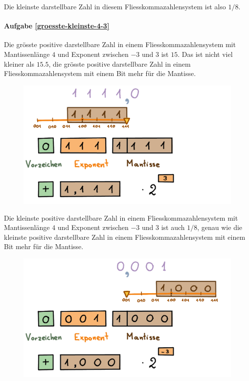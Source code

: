 Die kleinste darstellbare Zahl in diesem Fliesskommazahlensystem ist also \(1/8\).

\paragraph{Aufgabe \ref{groesste-kleinste-4-3}}
Die grösste positive darstellbare Zahl in einem Fliesskommazahlensystem mit Mantissenlänge \(4\) und Exponent zwischen \(-3\) und \(3\) ist \(15\). Das ist nicht viel kleiner als \(15.5\), die grösste positive darstellbare Zahl in einem Fliesskommazahlensystem mit einem Bit mehr für die Mantisse.
\begin{figure}[H]
\centering
\includegraphics[width=0.85\linewidth]{Pictures/groessteZahl-4-3.png}
\end{figure}

Die kleinste positive darstellbare Zahl in einem Fliesskommazahlensystem mit Mantissenlänge \(4\) und Exponent zwischen \(-3\) und \(3\) ist auch \(1/8\), genau wie die kleinste positive darstellbare Zahl in einem Fliesskommazahlensystem mit einem Bit mehr für die Mantisse.
\begin{figure}[H]
\centering
\includegraphics[width=0.85\linewidth]{Pictures/kleinsteZahl-4-3.png}
\end{figure}

